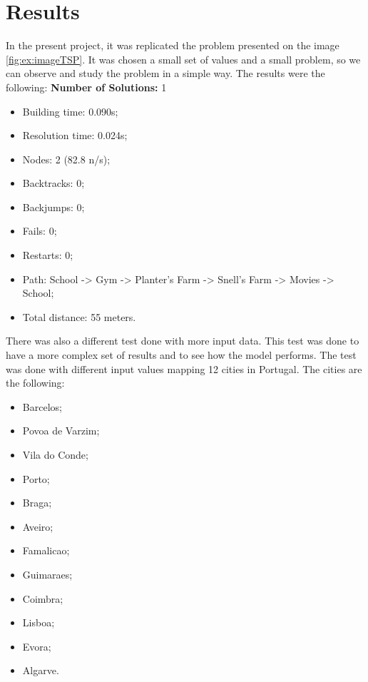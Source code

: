 \documentclass[runningheads,a4paper,english]{llncs}[2022/01/12]
\begin{document}
\section{Results}
\label{sec:Results}
In the present project, it was replicated the problem presented on the image \ref{fig:ex:imageTSP}. It was chosen a small set of values and a small problem, so we can observe and study the problem in a simple way. \newline \newline The results were the following:\newline
\textbf{ Number of Solutions:} 1
\begin{itemize}
  \item Building time: 0.090s;
  \item Resolution time: 0.024s;
  \item Nodes: 2 (82.8 n/s);
  \item Backtracks: 0;
  \item Backjumps: 0;
  \item Fails: 0;
  \item Restarts: 0;
  \item Path: School -> Gym -> Planter's Farm -> Snell's Farm -> Movies -> School;
  \item Total distance:  55 meters.
\end{itemize}
There was also a different test done with more input data. This test was done to have a more complex set of results and to see how the model performs.\newline
The test was done with different input values mapping 12 cities in Portugal. The cities are the following:
\begin{itemize}
  \item Barcelos;
  \item Povoa de Varzim;
  \item Vila do Conde;
  \item Porto;
  \item Braga;
  \item Aveiro;
  \item Famalicao;
  \item Guimaraes;
  \item Coimbra;
  \item Lisboa;
  \item Evora;
  \item Algarve.
\end{itemize}
\end{document}
